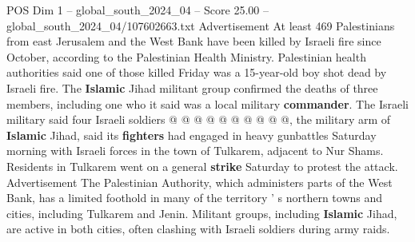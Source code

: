\begin{textsample}{POS Dim 1 – global\_south\_2024\_04 – Score 25.00 – global\_south\_2024\_04/107602663.txt}
Advertisement At least 469 Palestinians from east Jerusalem and the West Bank have been killed by Israeli fire since October, according to the Palestinian Health Ministry.
Palestinian health authorities said one of those killed Friday was a 15-year-old boy shot dead by Israeli fire.
The \textbf{Islamic} Jihad militant group confirmed the deaths of three members, including one who it said was a local military \textbf{commander}.
The Israeli military said four Israeli soldiers @ @ @ @ @ @ @ @ @ @, the military arm of \textbf{Islamic} Jihad, said its \textbf{fighters} had engaged in heavy gunbattles Saturday morning with Israeli forces in the town of Tulkarem, adjacent to Nur Shams.
Residents in Tulkarem went on a general \textbf{strike} Saturday to protest the attack.
Advertisement The Palestinian Authority, which administers parts of the West Bank, has a limited foothold in many of the territory ' s northern towns and cities, including Tulkarem and Jenin.
Militant groups, including \textbf{Islamic} Jihad, are active in both cities, often clashing with Israeli soldiers during army raids.

\end{textsample}

